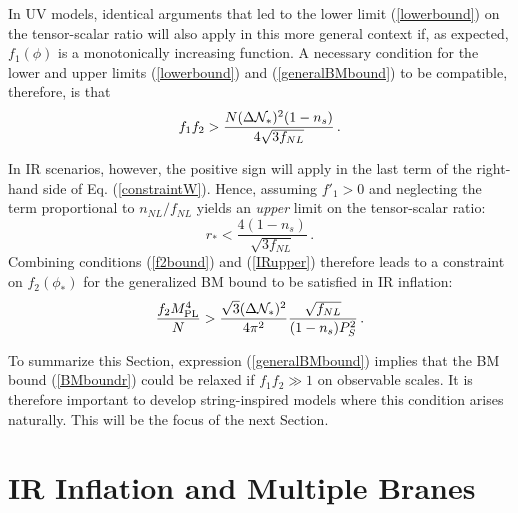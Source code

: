 In UV models, identical arguments that led to 
the lower limit (\ref{lowerbound}) on the tensor-scalar ratio
will also apply in this more general context if, as expected, $f_1 (\phi) $ 
is a monotonically increasing function. A necessary condition for
the lower and upper limits
(\ref{lowerbound}) and (\ref{generalBMbound}) to be compatible, therefore, is  
that  
\begin{equation}
\label{evade}
f_1f_2 > \frac{N (\Delta {\cal{N}}_*)^2 (1-n_s)}{4\sqrt{3f_{NL}}} \,.
\end{equation}

In IR scenarios, however, the positive sign will apply in the 
last term of the right-hand side of Eq. (\ref{constraintW}).
Hence, assuming $f'_1 >0$ and neglecting the term proportional to 
$n_{NL}/f_{NL}$ yields an {\em upper} limit on the tensor-scalar ratio:
\begin{equation}
\label{IRupper}
r_* < \frac{4(1-n_s)}{\sqrt{3f_{NL}}}  \,.
\end{equation}
Combining conditions (\ref{f2bound}) and (\ref{IRupper}) 
therefore leads to a constraint on $f_2 (\phi_*) $
for the generalized BM bound to be satisfied in IR inflation: 
\begin{equation}
\label{f2IRlolwer}
\frac{f_2M_{\mathrm{PL}}^4}{N} > \frac{\sqrt{3} (\Delta {\cal{N}}_*)^2}{4\pi^2}
\frac{\sqrt{f_{NL}}}{(1-n_s)P_S^2}  \,.
\end{equation}

To summarize this Section, 
expression (\ref{generalBMbound}) implies that the 
BM bound (\ref{BMboundr}) 
could be relaxed if $f_1f_2 \gg 1$ on observable scales. 
It is therefore important to develop string-inspired models 
where this condition arises naturally. This will be the focus of the 
next Section.
% 
% 
% 
% 
\section{IR Inflation and Multiple Branes}
\label{sec:multiple}


